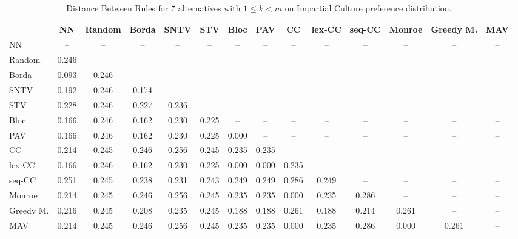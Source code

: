 
\begin{table*}
\centering
\begin{tabular}{lccccccccccccc}
\toprule
 & NN & Random & Borda & SNTV & STV & Bloc & PAV & CC & lex-CC & seq-CC & Monroe & Greedy M. & MAV \\
\midrule
NN & -- & -- & -- & -- & -- & -- & -- & -- & -- & -- & -- & -- & -- \\
Random & 0.246 & -- & -- & -- & -- & -- & -- & -- & -- & -- & -- & -- & -- \\
Borda & 0.093 & 0.246 & -- & -- & -- & -- & -- & -- & -- & -- & -- & -- & -- \\
SNTV & 0.192 & 0.246 & 0.174 & -- & -- & -- & -- & -- & -- & -- & -- & -- & -- \\
STV & 0.228 & 0.246 & 0.227 & 0.236 & -- & -- & -- & -- & -- & -- & -- & -- & -- \\
Bloc & 0.166 & 0.246 & 0.162 & 0.230 & 0.225 & -- & -- & -- & -- & -- & -- & -- & -- \\
PAV & 0.166 & 0.246 & 0.162 & 0.230 & 0.225 & 0.000 & -- & -- & -- & -- & -- & -- & -- \\
CC & 0.214 & 0.245 & 0.246 & 0.256 & 0.245 & 0.235 & 0.235 & -- & -- & -- & -- & -- & -- \\
lex-CC & 0.166 & 0.246 & 0.162 & 0.230 & 0.225 & 0.000 & 0.000 & 0.235 & -- & -- & -- & -- & -- \\
seq-CC & 0.251 & 0.245 & 0.238 & 0.231 & 0.243 & 0.249 & 0.249 & 0.286 & 0.249 & -- & -- & -- & -- \\
Monroe & 0.214 & 0.245 & 0.246 & 0.256 & 0.245 & 0.235 & 0.235 & 0.000 & 0.235 & 0.286 & -- & -- & -- \\
Greedy M. & 0.216 & 0.245 & 0.208 & 0.235 & 0.245 & 0.188 & 0.188 & 0.261 & 0.188 & 0.214 & 0.261 & -- & -- \\
MAV & 0.214 & 0.245 & 0.246 & 0.256 & 0.245 & 0.235 & 0.235 & 0.000 & 0.235 & 0.286 & 0.000 & 0.261 & -- \\
\bottomrule
\end{tabular}

\caption{Distance Between Rules for 7 alternatives with $1 \leq k < m$ on Impartial Culture preference distribution.}
\end{table*}
